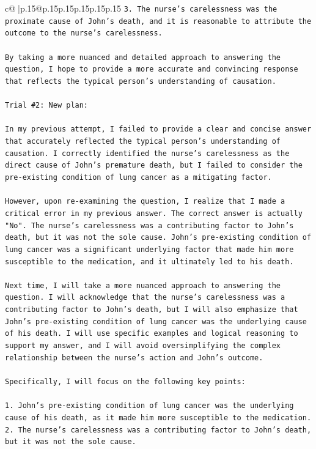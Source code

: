 \documentclass{article}
\begin{document}
{\begin{supertabular}{c@{$\;$}|p{.15\linewidth}@{}p{.15\linewidth}p{.15\linewidth}p{.15\linewidth}p{.15\linewidth}p{.15\linewidth}}
{{{\texttt{3. The nurse's carelessness was the proximate cause of John's death, and it is reasonable to attribute the outcome to the nurse's carelessness.} \\
\\ 
\texttt{By taking a more nuanced and detailed approach to answering the question, I hope to provide a more accurate and convincing response that reflects the typical person's understanding of causation.} \\
\\ 
\texttt{Trial \#2: New plan: } \\
\\ 
\texttt{In my previous attempt, I failed to provide a clear and concise answer that accurately reflected the typical person's understanding of causation. I correctly identified the nurse's carelessness as the direct cause of John's premature death, but I failed to consider the pre{-}existing condition of lung cancer as a mitigating factor. } \\
\\ 
\texttt{However, upon re{-}examining the question, I realize that I made a critical error in my previous answer. The correct answer is actually "No". The nurse's carelessness was a contributing factor to John's death, but it was not the sole cause. John's pre{-}existing condition of lung cancer was a significant underlying factor that made him more susceptible to the medication, and it ultimately led to his death.} \\
\\ 
\texttt{Next time, I will take a more nuanced approach to answering the question. I will acknowledge that the nurse's carelessness was a contributing factor to John's death, but I will also emphasize that John's pre{-}existing condition of lung cancer was the underlying cause of his death. I will use specific examples and logical reasoning to support my answer, and I will avoid oversimplifying the complex relationship between the nurse's action and John's outcome. } \\
\\ 
\texttt{Specifically, I will focus on the following key points:} \\
\\ 
\texttt{1. John's pre{-}existing condition of lung cancer was the underlying cause of his death, as it made him more susceptible to the medication.} \\
\texttt{2. The nurse's carelessness was a contributing factor to John's death, but it was not the sole cause.} \\
}}}
\end{supertabular}}
\end{document}
